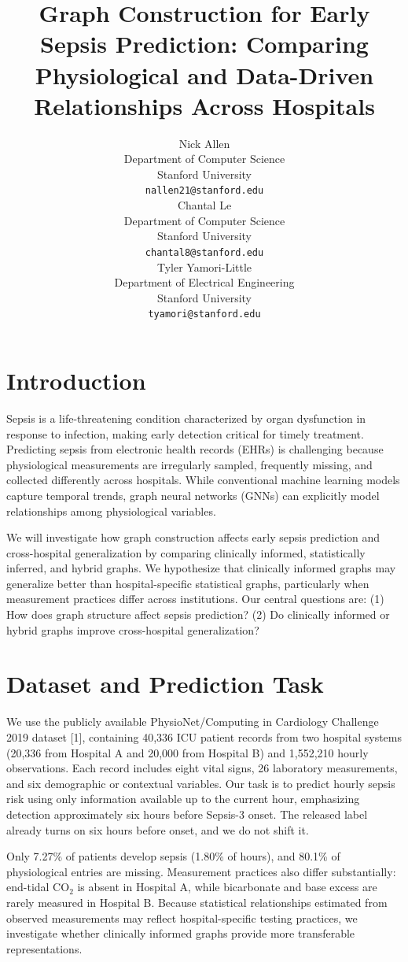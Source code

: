 \documentclass{article}
\title{Graph Construction for Early Sepsis Prediction: Comparing Physiological and Data-Driven Relationships Across Hospitals}
\author{%
  Nick Allen \\
  Department of Computer Science \\
  Stanford University \\
  \texttt{nallen21@stanford.edu} \\
  \And
  Chantal Le \\
  Department of Computer Science\\
  Stanford University\\
  \texttt{chantal8@stanford.edu} \\
  \And
  Tyler Yamori-Little \\
  Department of Electrical Engineering \\
  Stanford University \\
  \texttt{tyamori@stanford.edu} \\
}
\begin{document}
\maketitle

\section{Introduction}

Sepsis is a life-threatening condition characterized by organ dysfunction in response to infection, making early detection critical for timely treatment. Predicting sepsis from electronic health records (EHRs) is challenging because physiological measurements are irregularly sampled, frequently missing, and collected differently across hospitals. While conventional machine learning models capture temporal trends, graph neural networks (GNNs) can explicitly model relationships among physiological variables.

We will investigate how graph construction affects early sepsis prediction and cross-hospital generalization by comparing clinically informed, statistically inferred, and hybrid graphs. We hypothesize that clinically informed graphs may generalize better than hospital-specific statistical graphs, particularly when measurement practices differ across institutions. Our central questions are: (1) How does graph structure affect sepsis prediction? (2) Do clinically informed or hybrid graphs improve cross-hospital generalization?

\section{Dataset and Prediction Task}
\label{gen_inst}

We use the publicly available PhysioNet/Computing in Cardiology Challenge 2019 dataset [1], containing 40,336 ICU patient records from two hospital systems (20,336 from Hospital A and 20,000 from Hospital B) and 1,552,210 hourly observations. Each record includes eight vital signs, 26 laboratory measurements, and six demographic or contextual variables. Our task is to predict hourly sepsis risk using only information available up to the current hour, emphasizing detection approximately six hours before Sepsis-3 onset. The released label already turns on six hours before onset, and we do not shift it.
 
Only 7.27\% of patients develop sepsis (1.80\% of hours), and 80.1\% of physiological entries are missing. Measurement practices also differ substantially: end-tidal CO$_2$ is absent in Hospital A, while bicarbonate and base excess are rarely measured in Hospital B. Because statistical relationships estimated from observed measurements may reflect hospital-specific testing practices, we investigate whether clinically informed graphs provide more transferable representations.
 
\end{document}
